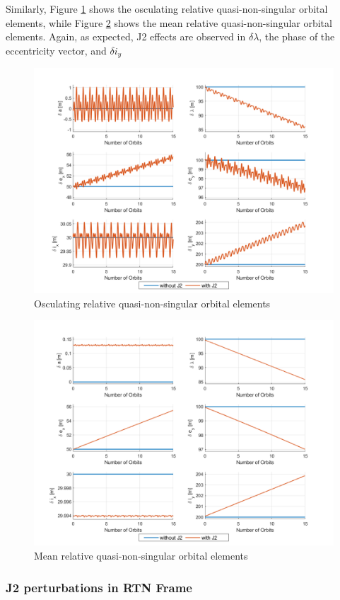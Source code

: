 Similarly, Figure \ref{fig:osc_ROE} shows the osculating relative quasi-non-singular orbital elements, while Figure \ref{fig:mean_ROE} shows the mean relative quasi-non-singular orbital elements. Again, as expected, J2 effects are observed in $\delta \lambda$, the phase of the eccentricity vector, and $\delta i_y$

\begin{figure}[H]
    \centering
    \includegraphics[width=0.75\linewidth]{sim/figures/PS4/ROE_osc_SV2.png}
    \caption{Osculating relative quasi-non-singular orbital elements}
    \label{fig:osc_ROE}
\end{figure}

\begin{figure}[H]
    \centering
    \includegraphics[width=0.75\linewidth]{sim/figures/PS4/ROE_mean_SV2.png}
    \caption{Mean relative quasi-non-singular orbital elements}
    \label{fig:mean_ROE}
\end{figure}

\subsubsection{J2 perturbations in RTN Frame}



